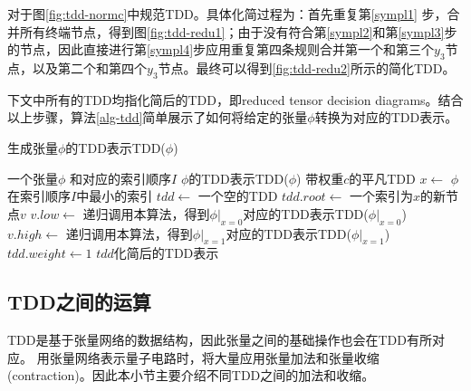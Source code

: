 对于图\ref{fig:tdd-normc}中规范TDD。具体化简过程为：首先重复第\ref{sympl1} 步，合并所有终端节点，得到图\ref{fig:tdd-redu1}；由于没有符合第\ref{sympl2}和第\ref{sympl3}步的节点，因此直接进行第\ref{sympl4}步应用重复第四条规则合并第一个和第三个$y_3$节点，以及第二个和第四个$y_3$节点。最终可以得到\ref{fig:tdd-redu2}所示的简化TDD。

下文中所有的TDD均指化简后的TDD，即reduced tensor decision diagrams。结合以上步骤，算法\ref{alg-tdd}简单展示了如何将给定的张量\(\phi\)转换为对应的TDD表示。
\begin{algorithm}
    \caption{生成张量\(\phi\)的TDD表示TDD(\(\phi\))}
    \label{alg-tdd}
    \begin{algorithmic}[1]
    \Require 一个张量\(\phi\) 和对应的索引顺序\(I\)
    \Ensure \(\phi\)的TDD表示TDD(\(\phi\))
        \State \Return 带权重$c$的平凡TDD
    \EndIf
    \State \(x \gets\) \(\phi\)在索引顺序\(I\)中最小的索引
    \State \(tdd \gets\) 一个空的TDD
    \State \(tdd.root \gets\) 一个索引为\(x\)的新节点\(v\) 
    \State \(v.low \gets\) 递归调用本算法，得到\(\phi|_{x=0}\)对应的TDD表示TDD(\(\phi|_{x=0}\))
    \State \(v.high \gets\) 递归调用本算法，得到\(\phi|_{x=1}\)对应的TDD表示TDD(\(\phi|_{x=1}\))
    \State \(tdd.weight \gets 1\)
    \State \Return \(tdd\)化简后的TDD表示
    \end{algorithmic}
\end{algorithm}


\subsection{TDD之间的运算}
TDD是基于张量网络的数据结构，因此张量之间的基础操作也会在TDD有所对应。
用张量网络表示量子电路时，将大量应用张量加法和张量收缩(contraction)。因此本小节主要介绍不同TDD之间的加法和收缩。
